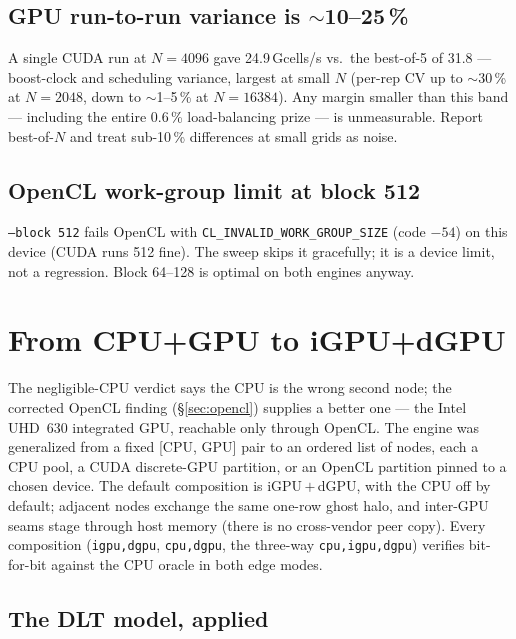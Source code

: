 \documentclass[
	english,
	letterpaper, oneside
]{article}
\begin{document}
\subsection{GPU run-to-run variance is $\sim$10--25\,\%}
\label{sec:variance}

A single CUDA run at $N=4096$ gave 24.9\,Gcells/s vs.\ the best-of-5 of 31.8 ---
boost-clock and scheduling variance, largest at small $N$ (per-rep CV up to $\sim$30\,\%
at $N=2048$, down to $\sim$1--5\,\% at $N=16384$). Any margin smaller than this band ---
including the entire 0.6\,\% load-balancing prize --- is unmeasurable. Report best-of-$N$
and treat sub-10\,\% differences at small grids as noise.

\subsection{OpenCL work-group limit at block 512}
\label{sec:wg512}

\texttt{--block 512} fails OpenCL with \texttt{CL\_INVALID\_WORK\_GROUP\_SIZE} (code
$-54$) on this device (CUDA runs 512 fine). The sweep skips it gracefully; it is a
device limit, not a regression. Block 64--128 is optimal on both engines anyway.

\section{From CPU+GPU to iGPU+dGPU}
\label{sec:twogpu}

The negligible-CPU verdict says the CPU is the wrong second node; the corrected
OpenCL finding (\S\ref{sec:opencl}) supplies a better one --- the Intel UHD~630
integrated GPU, reachable only through OpenCL. The engine was generalized from a
fixed [CPU, GPU] pair to an ordered list of nodes, each a CPU pool, a CUDA
discrete-GPU partition, or an OpenCL partition pinned to a chosen device. The default
composition is iGPU\,$+$\,dGPU, with the CPU off by default; adjacent nodes exchange
the same one-row ghost halo, and inter-GPU seams stage through host memory (there is no
cross-vendor peer copy). Every composition (\texttt{igpu,dgpu}, \texttt{cpu,dgpu}, the
three-way \texttt{cpu,igpu,dgpu}) verifies bit-for-bit against the CPU oracle in both
edge modes.

\subsection{The DLT model, applied}
\label{sec:twogpu-model}
\end{document}
